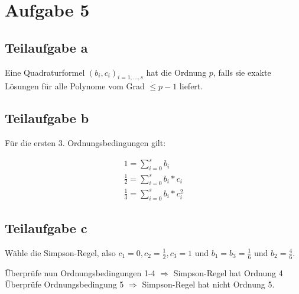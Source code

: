 \section*{Aufgabe 5}
\subsection*{Teilaufgabe a}
Eine Quadraturformel $(b_i, c_i)_{i=1, \dots, s}$ hat die Ordnung
$p$, falls sie exakte Lösungen für alle Polynome vom Grad $\leq p -1$
liefert.

\subsection*{Teilaufgabe b}
Für die ersten 3. Ordnungsbedingungen gilt:

\begin{align*}
	1 = \sum_{i = 0}^{s} b_i \\
 	\frac{1}{2} = \sum_{i = 0}^{s} b_i * c_i \\
 	\frac{1}{3} = \sum_{i = 0}^{s} b_i * c_i^2
\end{align*}

\subsection*{Teilaufgabe c}
Wähle die Simpson-Regel, also $c_1=0, c_2 = \frac{1}{2}, c_3 = 1$ und 
$b_1 = b_3 = \frac{1}{6}$ und $b_2 = \frac{4}{6}$.

Überprüfe nun Ordnungsbedingungen 1-4 $\Rightarrow$ Simpson-Regel hat Ordnung 4
Überprüfe Ordnungsbedingung 5 $\Rightarrow$ Simpson-Regel hat nicht Ordnung 5. %
